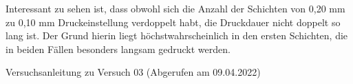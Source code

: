 \documentclass[a4paper,12pt,bibtotocnumbered]{scrartcl}
\numberwithin{equation}{section} %
\begin{document}
Interessant zu sehen ist, dass obwohl sich die Anzahl der Schichten von 0,20 mm zu 0,10 mm Druckeinstellung verdoppelt habt, die Druckdauer nicht doppelt so lang ist. Der Grund hierin liegt höchstwahrscheinlich in den ersten Schichten, die in beiden Fällen besonders langsam gedruckt werden.

\newpage
\begin{thebibliography}{999}
 Versuchsanleitung zu Versuch 03 (Abgerufen am 09.04.2022) 
\end{thebibliography}


%
\end{document}
